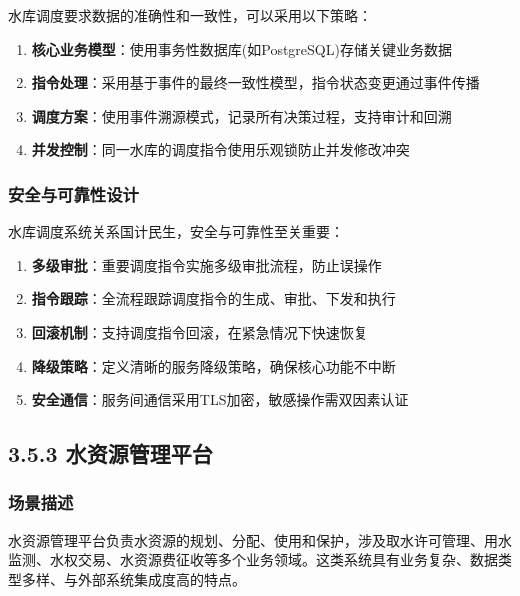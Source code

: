 水库调度要求数据的准确性和一致性，可以采用以下策略：

\begin{enumerate}
\def\labelenumi{\arabic{enumi}.}
\tightlist
\item
  \textbf{核心业务模型}：使用事务性数据库(如PostgreSQL)存储关键业务数据
\item
  \textbf{指令处理}：采用基于事件的最终一致性模型，指令状态变更通过事件传播
\item
  \textbf{调度方案}：使用事件溯源模式，记录所有决策过程，支持审计和回溯
\item
  \textbf{并发控制}：同一水库的调度指令使用乐观锁防止并发修改冲突
\end{enumerate}

\subsubsection{安全与可靠性设计}\label{ux5b89ux5168ux4e0eux53efux9760ux6027ux8bbeux8ba1}

水库调度系统关系国计民生，安全与可靠性至关重要：

\begin{enumerate}
\def\labelenumi{\arabic{enumi}.}
\tightlist
\item
  \textbf{多级审批}：重要调度指令实施多级审批流程，防止误操作
\item
  \textbf{指令跟踪}：全流程跟踪调度指令的生成、审批、下发和执行
\item
  \textbf{回滚机制}：支持调度指令回滚，在紧急情况下快速恢复
\item
  \textbf{降级策略}：定义清晰的服务降级策略，确保核心功能不中断
\item
  \textbf{安全通信}：服务间通信采用TLS加密，敏感操作需双因素认证
\end{enumerate}

\subsection{3.5.3
水资源管理平台}\label{ux6c34ux8d44ux6e90ux7ba1ux7406ux5e73ux53f0}

\subsubsection{场景描述}\label{ux573aux666fux63cfux8ff0-2}

水资源管理平台负责水资源的规划、分配、使用和保护，涉及取水许可管理、用水监测、水权交易、水资源费征收等多个业务领域。这类系统具有业务复杂、数据类型多样、与外部系统集成度高的特点。

